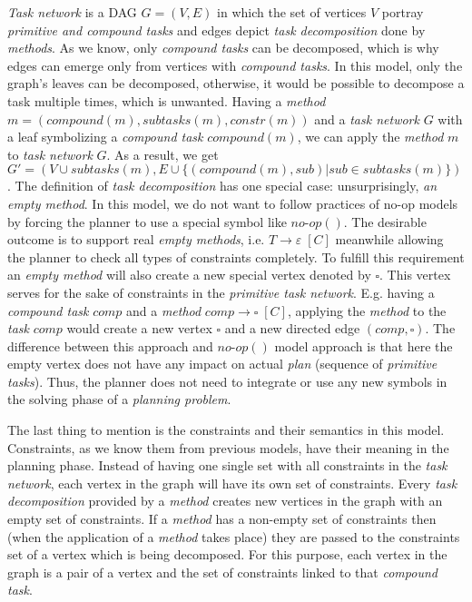 \medskip\noindent
\emph{Task network} is a DAG $G = (V, E)$ in which the set of vertices $V$ portray \emph{primitive and compound tasks} and edges depict \emph{task decomposition} done by \emph{methods}. As we know, only \emph{compound tasks} can be decomposed, which is why edges can emerge only from vertices with \emph{compound tasks}. In this model, only the graph's leaves can be decomposed, otherwise, it would be possible to decompose a task multiple times, which is unwanted. Having a \emph{method} $m = (compound(m), subtasks(m), constr(m))$ and a \emph{task network} $G$ with a leaf symbolizing a \emph{compound task} $compound(m)$, we can apply the \emph{method} $m$ to \emph{task network} $G$. As a result, we get $G' = (V \cup subtasks(m), E \cup \{(compound(m), sub) | sub \in subtasks(m)\})$. The definition of \emph{task decomposition} has one special case: unsurprisingly, \emph{an empty method}. In this model, we do not want to follow practices of no-op models by forcing the planner to use a special symbol like $no\text{-}op()$. The desirable outcome is to support real \emph{empty methods}, i.e. $T \rightarrow \varepsilon \; [C]$ meanwhile allowing the planner to check all types of constraints completely. To fulfill this requirement an \emph{empty method} will also create a new special vertex denoted by $\square$. This vertex serves for the sake of constraints in the \emph{primitive task network}. E.g. having a \emph{compound task} $comp$ and a \emph{method} $comp \rightarrow \square \; [C]$, applying the \emph{method} to the \emph{task} $comp$ would create a new vertex $\square$ and a new directed edge $(comp, \square)$. The difference between this approach and $no\text{-}op()$ model approach is that here the empty vertex does not have any impact on actual \emph{plan} (sequence of \emph{primitive tasks}). Thus, the planner does not need to integrate or use any new symbols in the solving phase of a \emph{planning problem}. 

\medskip\noindent
The last thing to mention is the constraints and their semantics in this model. Constraints, as we know them from previous models, have their meaning in the planning phase. Instead of having one single set with all constraints in the \emph{task network}, each vertex in the graph will have its own set of constraints. Every \emph{task decomposition} provided by a \emph{method} creates new vertices in the graph with an empty set of constraints. If a \emph{method} has a non-empty set of constraints then (when the application of a \emph{method} takes place) they are passed to the constraints set of a vertex which is being decomposed. For this purpose, each vertex in the graph is a pair of a vertex and the set of constraints linked to that \emph{compound task}.

